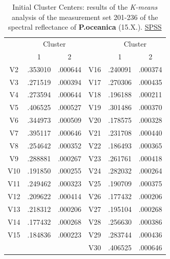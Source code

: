 \documentclass[10pt, a4paper]{article}
\begin{document}
\begin{appendices}
\begin{table}[htbp]
	\caption{Initial Cluster Centers: results of the \textit{K-means} analysis of the measurement set 201-236 of the spectral reflectance of \textbf{P.oceanica} (15.X.).  \href{http://www.spss.com/}{SPSS}}
	\label{tab:13}
	\begin{center}
	\begin{tabular}{|c|c|c|c|c|c|}
		\hline\hline
		& \multicolumn{2}{|c|}{Cluster} &  & \multicolumn{2}{|c|}{Cluster}\\
		 & 1 & 2 &  & 1 & 2 \\ \hline\hline
		V2 &	.353010 &	.000644 &	V16 &	.240091 &	.000374 \\ \hline
		V3 &	 .271519 &	.000394 &	V17 &	.270306 &	.000435 \\ \hline
		V4 &	.273594 &	.000644 &	V18 &	.196188 &	.000211 \\ \hline
		V5 &	.406525 &	.000527 &	V19 &	.301486 &	.000370 \\ \hline
		V6 &	.344973 &	.000509 &	V20 &	.178575 &	.000328 \\ \hline
		V7 &	.395117 &	.000646 &	V21 &	.231708 &	.000440 \\ \hline
		V8 &	.254642 &	.000352 &	V22 &	.186493 &	.000365 \\ \hline
		V9 &	.288881 &	.000267 &	V23 &	.261761 &	.000418 \\ \hline
		V10 &	.191850 &	.000255 &	V24 &	.282032 &	.000264 \\ \hline
		V11 &	.249462 &	.000323 &	V25 &	.190709 &	.000375 \\ \hline
		V12 &	.209622 &	.000414 &	V26 &	.177432 &	.000206 \\ \hline
		V13 &	.218312 &	.000206 &	V27 &	.195104 &	.000268 \\ \hline
		V14 &	.177432 &	.000268 &	V28 &	.256630 &	.000386 \\ \hline
		V15 &	.184836 &	.000223 &	V29 &	.283744 &	.000436 \\ \hline
		 &	 &	 &		V30 &	.406525 &	.000646 \\ \hline
	\end{tabular}
	\end{center}
	\label{tab:20}
\end{table}


\end{appendices}
\end{document}
